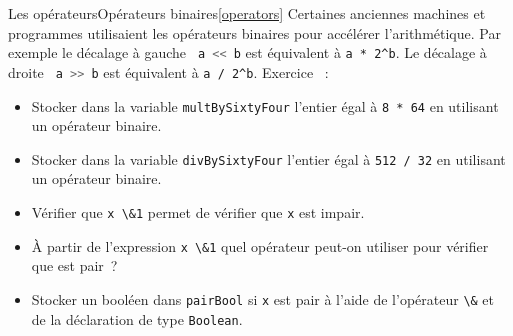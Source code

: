 \documentclass{beamer}
\begin{document}
    \begin{frame}{Les opérateurs}{Opérateurs binaires\cref{operators}}
        Certaines anciennes machines et programmes utilisaient les opérateurs binaires pour accélérer l'arithmétique.
        Par exemple le décalage à gauche \lstinline[language=Javascript]! a << b! est équivalent à \lstinline{a * 2^b}.
        Le décalage à droite \lstinline[language=Javascript]! a >> b! est équivalent à \lstinline{a / 2^b}.
        \bigbreak
        Exercice \execcounterdispinc{}~:
        \begin{itemize}
            \item Stocker dans la variable
            \lstinline{multBySixtyFour} l'entier égal à \lstinline{8 * 64} en utilisant un
            opérateur binaire.
            \item Stocker dans la variable
            \lstinline{divBySixtyFour} l'entier égal à \lstinline{512 / 32} en utilisant un
            opérateur binaire.
            \item Vérifier que \lstinline{x \&1} permet de vérifier que \lstinline{x} est impair.
            \item À partir de l'expression \lstinline{x \&1} quel opérateur peut-on utiliser pour vérifier que est pair~?
            \item Stocker un booléen dans \lstinline{pairBool} si \lstinline{x} est pair à l'aide
            de l'opérateur \lstinline{\&} et de la déclaration de type \lstinline{Boolean}.
        \end{itemize}
    \end{frame}
\end{document}

